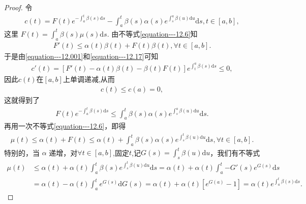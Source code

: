 \documentclass[../../main.tex]{subfiles}
\begin{document}
\begin{proof}
令
\begin{align}
c(t)=F(t)e^{-\int_{a}^{t}\beta(s)\mathrm{d}s}-\int_{a}^{t}\beta(s)\alpha(s)e^{\int_{s}^{a}\beta(u)\mathrm{d}u}\mathrm{d}s,t\in[a,b],\label{equation---12.001}
\end{align}
这里 $F(t)=\int_{a}^{t}\beta(s)\mu(s)\mathrm{d}s$. 由不等式\eqref{equation---12.6}知
\begin{align}
F'(t)\leqslant\alpha(t)\beta(t)+F(t)\beta(t),\forall t\in[a,b].\label{equation---12.17}
\end{align}
于是由\eqref{equation---12.001}和\eqref{equation---12.17}可知
\begin{align*}
c'(t)=[F'(t)-\alpha(t)\beta(t)-\beta(t)F(t)]e^{\int_{t}^{a}\beta(s)\mathrm{d}s}\leqslant0,
\end{align*}
因此$c(t)$在$[a,b]$上单调递减,从而
\begin{align*}
c(t)\leqslant c(a)=0,
\end{align*}
这就得到了
\begin{align*}
F(t)e^{-\int_{a}^{t}\beta(s)\mathrm{d}s}\leqslant\int_{a}^{t}\beta(s)\alpha(s)e^{\int_{s}^{a}\beta(u)\mathrm{d}u}\mathrm{d}s.
\end{align*}
再用一次不等式\eqref{equation---12.6}，即得
\begin{align*}
\mu(t)\leqslant\alpha(t)+F(t)\leqslant\alpha(t)+\int_{a}^{t}\beta(s)\alpha(s)e^{\int_{s}^{t}\beta(u)\mathrm{d}u}\mathrm{d}s,\forall t\in[a,b].
\end{align*}
特别的，当 $\alpha$ 递增，对$\forall t\in [a,b]$,固定$t$,记$G(s)=\int_s^t{\beta (u)\mathrm{d}u}$，我们有不等式
\begin{align*}
\mu (t)&\leqslant \alpha (t)+\alpha (t)\int_a^t{\beta (s)e^{\int_s^t{\beta (u)\mathrm{d}u}}\mathrm{d}s}=\alpha (t)+\alpha (t)\int_a^t{-G' \left( s \right) e^{G\left( s \right)}\mathrm{d}s}
\\
&=\alpha (t)-\alpha (t)\int_a^t{e^{G\left( s \right)}\mathrm{d}G\left( s \right)}=\alpha (t)+\alpha (t)\left[ e^{G\left( a \right)}-1 \right] =\alpha (t)e^{\int_a^t{\beta (s)\mathrm{d}s}}.
\end{align*} 

\end{proof}
\end{document}

